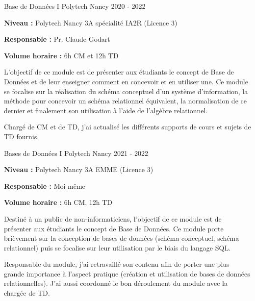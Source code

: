 \documentclass[12pt, a4paper]{awesome-cv}
\begin{document}
\begin{cventries}
  \cventry
  {Base de Données I}
  {Polytech Nancy}
  {}
  {2020 - 2022}
  {
    \begin{cvitems}
      \item {\textbf{Niveau : } Polytech Nancy 3A spécialité IA2R (Licence 3)}
      \item {\textbf{Responsable : } Pr. Claude Godart}
      \item {\textbf{Volume horaire : } 6h CM et 12h TD}
    \end{cvitems}
  }

  \begin{cvparagraph}
    L'objectif de ce module est de présenter aux étudiants le concept de Base de Données et de leur enseigner comment en concevoir et en utiliser une.
    Ce module se focalise sur la réalisation du schéma conceptuel d'un système d'information, la méthode pour concevoir un schéma relationnel équivalent, la normalisation de ce dernier et finalement son utilisation à l'aide de l'algèbre relationnel.
  \end{cvparagraph}

  \begin{cvparagraph}
    Chargé de CM et de TD, j'ai actualisé les différents supports de cours et sujets de TD fournis.
  \end{cvparagraph}

  \cventry
  {Bases de Données I}
  {Polytech Nancy}
  {}
  {2021 - 2022}
  {
    \begin{cvitems}
      \item {\textbf{Niveau : } Polytech Nancy 3A EMME (Licence 3)}
      \item {\textbf{Responsable : } Moi-même}
      \item {\textbf{Volume horaire : } 6h CM, 12h TD}
    \end{cvitems}
  }

  \begin{cvparagraph}
    Destiné à un public de non-informaticiens, l'objectif de ce module est de présenter aux étudiants le concept de Base de Données.
    Ce module porte brièvement sur la conception de bases de données (schéma conceptuel, schéma relationnel) puis se focalise sur leur utilisation par le biais du langage SQL.
  \end{cvparagraph}

  \begin{cvparagraph}
    Responsable du module, j'ai retravaillé son contenu afin de porter une plus grande importance à l'aspect pratique (création et utilisation de bases de données relationnelles).
    J'ai aussi coordonné le bon déroulement du module avec la chargée de TD.
  \end{cvparagraph}


\end{cventries}
\end{document}
